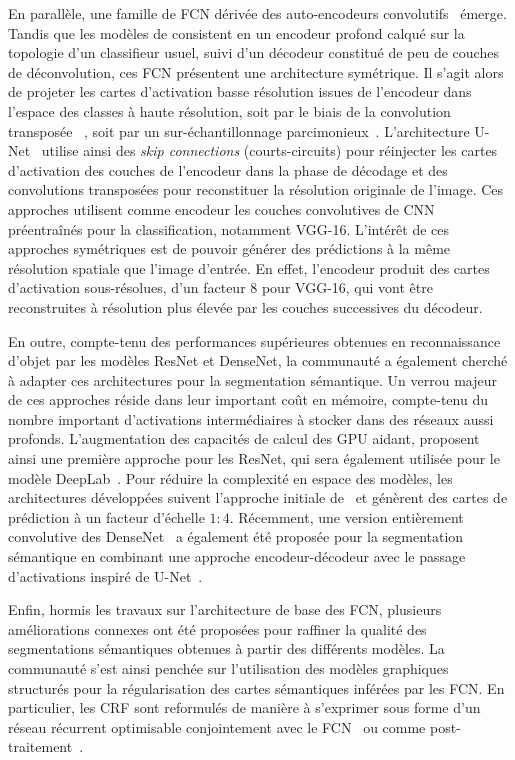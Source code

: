En parallèle, une famille de \gls{FCN} dérivée des auto-encodeurs convolutifs~\cite{zhao_stacked_2015} émerge. Tandis que les modèles de \citet{long_fully_2015} consistent en un encodeur profond calqué sur la topologie d'un classifieur usuel, suivi d'un décodeur constitué de peu de couches de déconvolution, ces \gls{FCN} présentent une architecture symétrique. Il s'agit alors de projeter les cartes d'activation basse résolution issues de l'encodeur dans l'espace des classes à haute résolution, soit par le biais de la convolution transposée ~\cite{nekrasov_global_2016,noh_learning_2015}, soit par un sur-échantillonnage parcimonieux~\cite{badrinarayanan_segnet_2017}. L'architecture U-Net~\cite{ronneberger_u-net_2015} utilise ainsi des \emph{skip connections} (courts-circuits) pour réinjecter les cartes d'activation des couches de l'encodeur dans la phase de décodage et des convolutions transposées pour reconstituer la résolution originale de l'image. Ces approches utilisent comme encodeur les couches convolutives de \gls{CNN} préentraînés pour la classification, notamment VGG-16. L'intérêt de ces approches symétriques est de pouvoir générer des prédictions à la même résolution spatiale que l'image d'entrée. En effet, l'encodeur produit des cartes d'activation sous-résolues, d'un facteur 8 pour VGG-16, qui vont être reconstruites à résolution plus élevée par les couches successives du décodeur.

En outre, compte-tenu des performances supérieures obtenues en reconnaissance d'objet par les modèles ResNet et DenseNet, la communauté a également cherché à adapter ces architectures pour la segmentation sémantique. Un verrou majeur de ces approches réside dans leur important coût en mémoire, compte-tenu du nombre important d'activations intermédiaires à stocker dans des réseaux aussi profonds. L'augmentation des capacités de calcul des \gls{GPU} aidant, \citet{wu_high-performance_2016} proposent ainsi une première approche pour les ResNet, qui sera également utilisée pour le modèle DeepLab~\cite{chen_deeplab_2018}. Pour réduire la complexité en espace des modèles, les architectures développées suivent l'approche initiale de~\citet{long_fully_2015} et génèrent des cartes de prédiction à un facteur d'échelle $1:4$. Récemment, une version entièrement convolutive des DenseNet~\cite{jegou_one_2017} a également été proposée pour la segmentation sémantique en combinant une approche encodeur-décodeur avec le passage d'activations inspiré de U-Net~\cite{ronneberger_u-net_2015}.

Enfin, hormis les travaux sur l'architecture de base des \gls{FCN}, plusieurs améliorations connexes ont été proposées pour raffiner la qualité des segmentations sémantiques obtenues à partir des différents modèles. La communauté s'est ainsi penchée sur l'utilisation des modèles graphiques structurés pour la régularisation des cartes sémantiques inférées par les \gls{FCN}. En particulier, les \gls{CRF} sont reformulés de manière à s'exprimer sous forme d'un réseau récurrent optimisable conjointement avec le \gls{FCN}~\cite{zheng_conditional_2015} ou comme post-traitement~\cite{arnab_higher_2016}.

